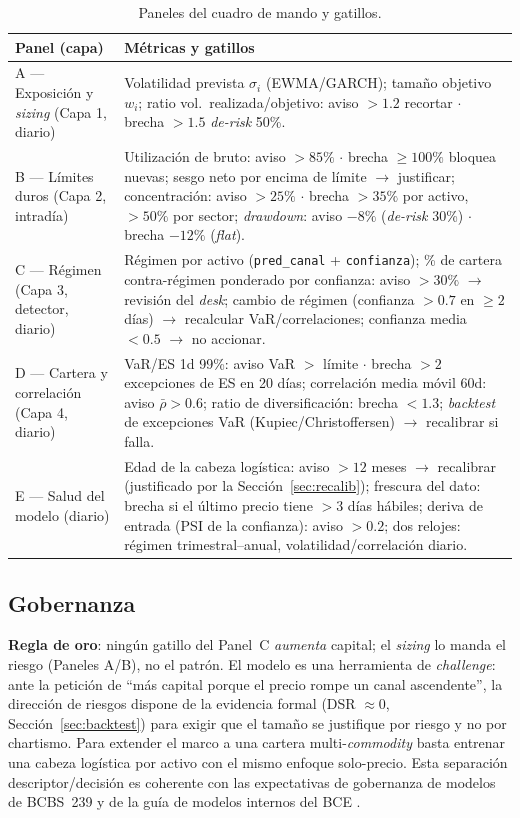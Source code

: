 \documentclass[11pt,a4paper]{article}
\begin{document}
\begin{table}[H]
\centering
\footnotesize
\caption{Paneles del cuadro de mando y gatillos.}
\label{tab:dashboard}
\begin{tabularx}{\textwidth}{p{3.4cm} L}
\toprule
\textbf{Panel (capa)} & \textbf{Métricas y gatillos} \\
\midrule
A --- Exposición y \emph{sizing} (Capa 1, diario) &
Volatilidad prevista $\sigma_i$ (EWMA/GARCH); tamaño objetivo $w_i$; ratio
vol.\ realizada/objetivo: aviso $>1.2$ recortar $\cdot$ brecha $>1.5$
\emph{de-risk} 50\%. \\
B --- Límites duros (Capa 2, intradía) &
Utilización de bruto: aviso $>85\%$ $\cdot$ brecha $\geq 100\%$ bloquea nuevas;
sesgo neto por encima de límite $\to$ justificar; concentración: aviso $>25\%$
$\cdot$ brecha $>35\%$ por activo, $>50\%$ por sector; \emph{drawdown}: aviso
$-8\%$ (\emph{de-risk} 30\%) $\cdot$ brecha $-12\%$ (\emph{flat}). \\
C --- Régimen (Capa 3, detector, diario) &
Régimen por activo (\texttt{pred\_canal} + \texttt{confianza}); \% de cartera
contra-régimen ponderado por confianza: aviso $>30\%$ $\to$ revisión del
\emph{desk}; cambio de régimen (confianza $>0.7$ en $\geq 2$ días) $\to$
recalcular VaR/correlaciones; confianza media $<0.5$ $\to$ no accionar. \\
D --- Cartera y correlación (Capa 4, diario) &
VaR/ES 1d 99\%: aviso VaR $>$ límite $\cdot$ brecha $>2$ excepciones de ES en 20
días; correlación media móvil 60d: aviso $\bar\rho>0.6$; ratio de
diversificación: brecha $<1.3$; \emph{backtest} de excepciones VaR
(Kupiec/Christoffersen) $\to$ recalibrar si falla. \\
E --- Salud del modelo (diario) &
Edad de la cabeza logística: aviso $>12$ meses $\to$ recalibrar (justificado por
la Sección~\ref{sec:recalib}); frescura del dato: brecha si el último precio
tiene $>3$ días hábiles; deriva de entrada (PSI de la confianza): aviso $>0.2$;
dos relojes: régimen trimestral--anual, volatilidad/correlación diario. \\
\bottomrule
\end{tabularx}
\end{table}

\subsection{Gobernanza}
\textbf{Regla de oro}: ningún gatillo del Panel~C \emph{aumenta} capital; el
\emph{sizing} lo manda el riesgo (Paneles A/B), no el patrón. El modelo es una
herramienta de \emph{challenge}: ante la petición de ``más capital porque el
precio rompe un canal ascendente'', la dirección de riesgos dispone de la
evidencia formal (DSR $\approx 0$, Sección~\ref{sec:backtest}) para exigir que el
tamaño se justifique por riesgo y no por chartismo. Para extender el marco a una
cartera multi-\emph{commodity} basta entrenar una cabeza logística por activo con
el mismo enfoque solo-precio. Esta separación descriptor/decisión es coherente
con las expectativas de gobernanza de modelos de BCBS~239 y de la guía de
modelos internos del BCE \cite{bcbs239,ecb2025guide}.
\end{document}
